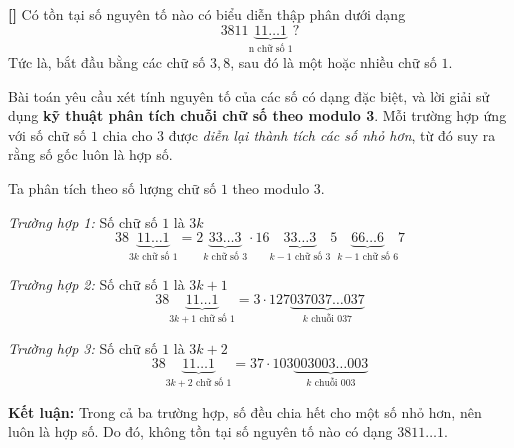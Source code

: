 \documentclass[../01-divisibility.tex]{subfiles}
\begin{document}
\begin{example*}\label{example:BxMO-2015-P3}\textbf{[]}
	Có tồn tại số nguyên tố nào có biểu diễn thập phân dưới dạng
	\[
		3811\underbrace{11\ldots1}_{\text{n chữ số }1}?
	\]
	Tức là, bắt đầu bằng các chữ số \( 3, 8 \), sau đó là một hoặc nhiều chữ số \( 1 \).
\end{example*}

\begin{story*}
	Bài toán yêu cầu xét tính nguyên tố của các số có dạng đặc biệt, và lời giải sử dụng \textbf{kỹ thuật phân tích chuỗi chữ số theo modulo 3}. 
	Mỗi trường hợp ứng với số chữ số \( 1 \) chia cho \( 3 \) được \textit{diễn lại thành tích các số nhỏ hơn}, từ đó suy ra rằng số gốc luôn là hợp số.
\end{story*}

\begin{soln}\footnotemark
	Ta phân tích theo số lượng chữ số \( 1 \) theo modulo 3.

	\textit{Trường hợp 1:} Số chữ số \( 1 \) là \( 3k \)
	\[
		38\underbrace{11\ldots1}_{3k\text{ chữ số }1}
		= 2\underbrace{33\ldots3}_{k\text{ chữ số }3}
		\cdot 16\underbrace{33\ldots3}_{k-1\text{ chữ số }3}
		5\underbrace{66\ldots6}_{k-1\text{ chữ số }6}
		7
	\]
	
	\textit{Trường hợp 2:} Số chữ số \( 1 \) là \( 3k + 1 \)
	\[
		38\underbrace{11\ldots1}_{3k+1\text{ chữ số }1}
		= 3 \cdot 127\underbrace{037037\ldots037}_{k\text{ chuỗi }037}
	\]
	
	\textit{Trường hợp 3:} Số chữ số \( 1 \) là \( 3k + 2 \)
	\[
		38\underbrace{11\ldots1}_{3k+2\text{ chữ số }1}
		= 37 \cdot 103\underbrace{003003\ldots003}_{k\text{ chuỗi }003}
	\]

	\textbf{Kết luận:} Trong cả ba trường hợp, số đều chia hết cho một số nhỏ hơn, nên luôn là hợp số. Do đó, không tồn tại số nguyên tố nào có dạng \( 3811\ldots1 \).
\end{soln}

\end{document}
